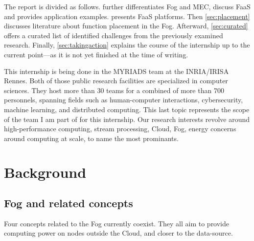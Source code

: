 The report is divided as follows.  further differentiates Fog and \gls{MEC}, discuss \gls{FaaS} and provides application examples.  presents \gls{FaaS} platforms. Then \cref{sec:placement} discusses literature about function placement in the Fog. Afterward, \cref{sec:curated} offers a curated list of identified challenges from the previously examined research. Finally, \cref{sec:takingaction} explains the course of the internship up to the current point—as it is not yet finished at the time of writing.

\varthreestars{}

This internship is being done in the MYRIADS team at the INRIA/IRISA Rennes. Both of those public research facilities are specialized in computer sciences. They host more than 30 teams for a combined of more than 700 personnels, spanning fields such as human-computer interactions, cybersecurity, machine learning, and distributed computing. This last topic represents the scope of the team I am part of for this internship. Our research interests revolve around high-performance computing, stream processing, Cloud, Fog, energy concerns around computing at scale, to name the most prominants.

\section{Background}
\label{sec:background}

\subsection{Fog and related concepts}

Four concepts related to the Fog currently coexist. They all aim to provide computing power on nodes outside the Cloud, and closer to the data-source.

